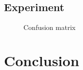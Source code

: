 \documentclass[10pt,twocolumn,letterpaper]{article}
\begin{document}
\subsection{Experiment}

\blindtext

\begin{figure}[h]
\begin{center}
\fbox{\rule{0pt}{2in} \rule{0.9\linewidth}{0pt}}
\end{center}
   \caption{Confusion matrix}
\label{fig:long}
\label{fig:onecol}
\end{figure}




\section{Conclusion}
\blindtext

{\small


}
\end{document}

